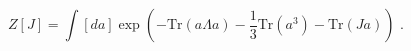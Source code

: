 \begin{equation}
Z[J]=\int [d{a}] \exp\left( - \mbox{Tr}({a}\Lambda{a}) -\frac{1}{3} \mbox{Tr}%
({a}^3) -\mbox{Tr}(J{a}) \right)\,\,.
\end{equation}

